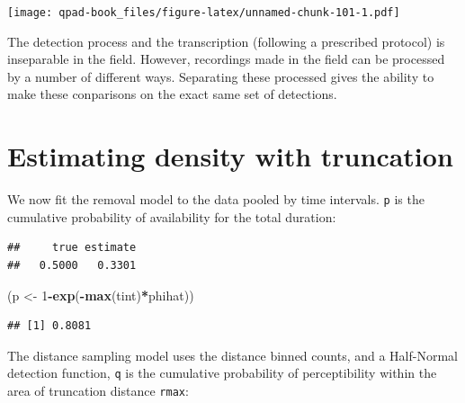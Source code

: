 \documentclass[12pt,]{book}
\newenvironment{Shaded}{\begin{snugshade}}{\end{snugshade}}
\newcommand{\DataTypeTok}[1]{\textcolor[rgb]{0.13,0.29,0.53}{#1}}
\newcommand{\DecValTok}[1]{\textcolor[rgb]{0.00,0.00,0.81}{#1}}
\newcommand{\KeywordTok}[1]{\textcolor[rgb]{0.13,0.29,0.53}{\textbf{#1}}}
\newcommand{\NormalTok}[1]{#1}
\newcommand{\OperatorTok}[1]{\textcolor[rgb]{0.81,0.36,0.00}{\textbf{#1}}}
\newcommand{\StringTok}[1]{\textcolor[rgb]{0.31,0.60,0.02}{#1}}
\begin{document}
\texttt{[image: qpad-book\_files/figure-latex/unnamed-chunk-101-1.pdf]}

The detection process and the transcription (following a prescribed
protocol) is inseparable in the field. However, recordings
made in the field can be processed by a number of different ways.
Separating these processed gives the ability to make these
conparisons on the exact same set of detections.

\hypertarget{estimating-density-with-truncation}{%
\section{Estimating density with truncation}\label{estimating-density-with-truncation}}

We now fit the removal model to the data pooled by time intervals.
\texttt{p} is the cumulative probability of availability for the total duration:

\begin{Shaded}
\end{Shaded}

\begin{verbatim}
##     true estimate 
##   0.5000   0.3301
\end{verbatim}

\begin{Shaded}
\begin{Highlighting}[]
\NormalTok{(p <-}\StringTok{ }\DecValTok{1}\OperatorTok{-}\KeywordTok{exp}\NormalTok{(}\OperatorTok{-}\KeywordTok{max}\NormalTok{(tint)}\OperatorTok{*}\NormalTok{phihat))}
\end{Highlighting}
\end{Shaded}

\begin{verbatim}
## [1] 0.8081
\end{verbatim}

The distance sampling model uses the distance binned counts,
and a Half-Normal detection function, \texttt{q} is the cumulative
probability of perceptibility within the area of
truncation distance \texttt{rmax}:
\end{document}
